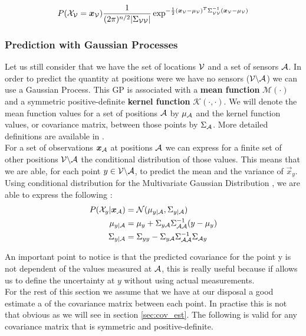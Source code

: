 \documentclass[12pt,twoside]{report}
\begin{document}
\begin{equation}
	P(\mathcal{X}_{\mathcal{V}} = {\boldsymbol{{x}}}_{\mathcal{V}}) \frac{1}{(2\pi)^{n/2} |\Sigma_{\mathcal{V}\mathcal{V}}|} \exp^{-\frac{1}{2}({\boldsymbol{{x}}}_{\mathcal{V}} - \mu_{\mathcal{V}})^T \Sigma_{\mathcal{V}\mathcal{V}}^{-1} ({\boldsymbol{{x}}}_{\mathcal{V}} - \mu_{\mathcal{V}})}
\end{equation}


\subsubsection{Prediction with Gaussian Processes}
Let us still consider that we have the set of locations $\mathcal{V}$ and a set of sensors $\mathcal{A}$. In order to predict the quantity at positions were we have no sensors ($\mathcal{V} \backslash \mathcal{A} $) we can use a Gaussian Process. This GP is associated with a \textbf{mean function} $\mathcal{M}(\cdot)$ and a symmetric positive-definite \textbf{kernel function} $\mathcal{K}(\cdot,\cdot)$. We will denote the mean function values for a set of positions $\mathcal{A}$ by $\mu_{\mathcal{A}}$ and the kernel function values, or covariance matrix, between those points by $\Sigma_{\mathcal{A}}$. More detailed definitions are available in \citet[p.~13-16]{rasmussen_gaussian_2006}. \\

For a set of observations ${\boldsymbol{{x}}}_{\mathcal{A}}$ at positions $\mathcal{A}$ we can express for a finite set of other positions $\mathcal{V} \backslash \mathcal{A} $ the conditional distribution of those values. This means that we are able, for each point $y \in \mathcal{V} \backslash \mathcal{A} $, to predict the mean and the variance of $\vec{x}_y$. Using conditional distribution for the Multivariate Gaussian Distribution \citep[p.~193]{deisenroth_mathematics_2018}, we are able to express the following : 
\begin{align}
	P(\mathcal{X}_y | {\boldsymbol{{x}}}_{\mathcal{A}} ) &= \mathcal{N}(\mu_{y | \mathcal{A}}, \Sigma_{y | \mathcal{A}}) \\
	\mu_{y | \mathcal{A}} &= \mu_y + \Sigma_{y\mathcal{A}} \Sigma_{\mathcal{A}\mathcal{A}}^{-1} (y - \mu_y)\\ 
	\Sigma_{y | \mathcal{A}} &=  \Sigma_{yy} - \Sigma_{y\mathcal{A}} \Sigma_{\mathcal{A}\mathcal{A}}^{-1} \Sigma_{\mathcal{A} y} \label{equ:covGP}
\end{align}


An important point to notice is that the predicted covariance for the point y is not dependent of the values measured at $\mathcal{A}$, this is really useful because if allows us to define the uncertainty at $y$ without using actual measurements. \\

For the rest of this section we assume that we have at our disposal a good estimate a of the covariance matrix between each point. In practise this is not that obvious as we will see in section \ref{sec:cov_est}. The following is valid for any covariance matrix that is symmetric and positive-definite. 
\end{document}
